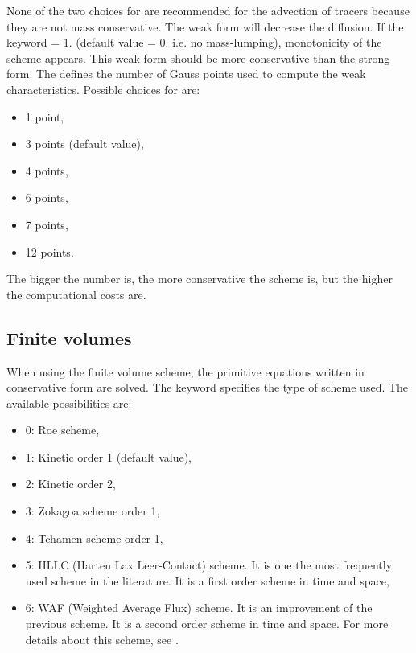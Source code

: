 None of the two choices for 
are recommended for the advection of tracers because they are not
mass conservative. The weak form will decrease the diffusion. If the keyword
 = 1. (default value = 0. i.e. no
mass-lumping), monotonicity of the scheme appears. This weak form should be
more conservative than the strong form. The  defines the number of Gauss points used to compute the
weak characteristics.
Possible choices for  are:
\begin{itemize}
\item 1 point,
\item 3 points (default value),
\item 4 points,
\item 6 points,
\item 7 points,
\item 12 points.
\end{itemize}
The bigger the number is, the more conservative the scheme is, but the higher the
computational costs are.

\subsection{Finite volumes}
When using the finite volume scheme, the primitive equations written
in conservative form are solved.
The keyword  specifies the type of scheme used.
The available possibilities are:

\begin{itemize}
\item 0: Roe scheme,

\item 1: Kinetic order 1 (default value),

\item 2: Kinetic order 2,

\item 3: Zokagoa scheme order 1,

\item 4: Tchamen scheme order 1,

\item 5: HLLC (Harten Lax Leer-Contact) scheme.
It is one the most frequently used scheme in the literature.
It is a first order scheme in time and space,

\item 6: WAF (Weighted Average Flux) scheme.
It is an improvement of the previous scheme.
It is a second order scheme in time and space.
For more details about this scheme, see \cite{Ata2012}.
\end{itemize}

